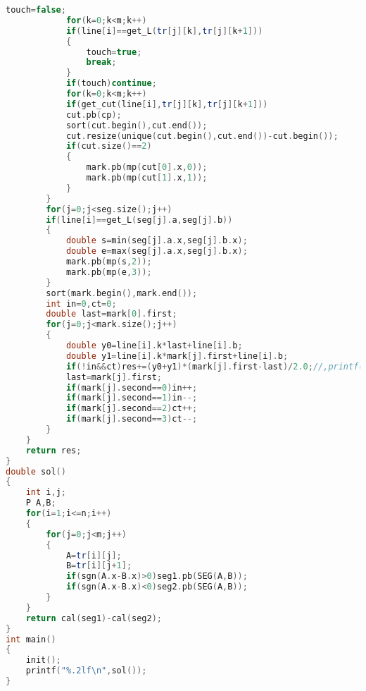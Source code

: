 \begin{lstlisting}[language=c++]
            touch=false;
            for(k=0;k<m;k++)
            if(line[i]==get_L(tr[j][k],tr[j][k+1]))
            {
                touch=true;
                break;
            }
            if(touch)continue;
            for(k=0;k<m;k++)
            if(get_cut(line[i],tr[j][k],tr[j][k+1]))
            cut.pb(cp);
            sort(cut.begin(),cut.end());
            cut.resize(unique(cut.begin(),cut.end())-cut.begin());
            if(cut.size()==2)
            {
                mark.pb(mp(cut[0].x,0));
                mark.pb(mp(cut[1].x,1));
            }
        }
        for(j=0;j<seg.size();j++)
        if(line[i]==get_L(seg[j].a,seg[j].b))
        {
            double s=min(seg[j].a.x,seg[j].b.x);
            double e=max(seg[j].a.x,seg[j].b.x);
            mark.pb(mp(s,2));
            mark.pb(mp(e,3));
        }
        sort(mark.begin(),mark.end());
        int in=0,ct=0;
        double last=mark[0].first;
        for(j=0;j<mark.size();j++)
        {
            double y0=line[i].k*last+line[i].b;
            double y1=line[i].k*mark[j].first+line[i].b;
            if(!in&&ct)res+=(y0+y1)*(mark[j].first-last)/2.0;//,printf("%.1lf %.1lf %.1lf\n",y0,y1,mark[j].first-last);
            last=mark[j].first;
            if(mark[j].second==0)in++;
            if(mark[j].second==1)in--;
            if(mark[j].second==2)ct++;
            if(mark[j].second==3)ct--;
        }
    }
    return res;
}
double sol()
{
    int i,j;
    P A,B;
    for(i=1;i<=n;i++)
    {
        for(j=0;j<m;j++)
        {
            A=tr[i][j];
            B=tr[i][j+1];  
            if(sgn(A.x-B.x)>0)seg1.pb(SEG(A,B));
            if(sgn(A.x-B.x)<0)seg2.pb(SEG(A,B));
        }
    }
    return cal(seg1)-cal(seg2);
}
int main()
{
    init();
    printf("%.2lf\n",sol());
}
    \end{lstlisting}
